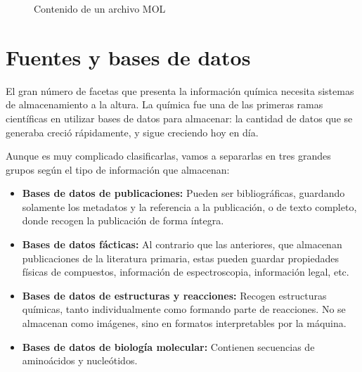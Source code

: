 \begin{figure}[H]
\centering
    \caption{Contenido de un archivo MOL \cite{molfile_example}} \label{fig:figura2}
\end{figure}


\section*{Fuentes y bases de datos}

El gran número de facetas que presenta la información química necesita sistemas de almacenamiento a la altura. La química fue una de las primeras ramas científicas en utilizar bases de datos para almacenar: la cantidad de datos que se generaba creció rápidamente, y sigue creciendo hoy en día. 

Aunque es muy complicado clasificarlas, vamos a separarlas en tres grandes grupos según el tipo de información que almacenan: \cite{doi:10.1021/ci600234z}
\begin{itemize}
    \item \textbf{Bases de datos de publicaciones:} Pueden ser bibliográficas, guardando solamente los metadatos y la referencia a la publicación, o de texto completo, donde recogen la publicación de forma íntegra. %
    \item \textbf{Bases de datos fácticas:} Al contrario que las anteriores, que almacenan publicaciones de la literatura primaria, estas pueden guardar propiedades físicas de compuestos, información de espectroscopia, información legal, etc.
    \item \textbf{Bases de datos de estructuras y reacciones:} Recogen estructuras químicas, tanto individualmente como formando parte de reacciones. No se almacenan como imágenes, sino en formatos interpretables por la máquina.
    \item \textbf{Bases de datos de biología molecular:} Contienen secuencias de aminoácidos y nucleótidos.
\end{itemize}


